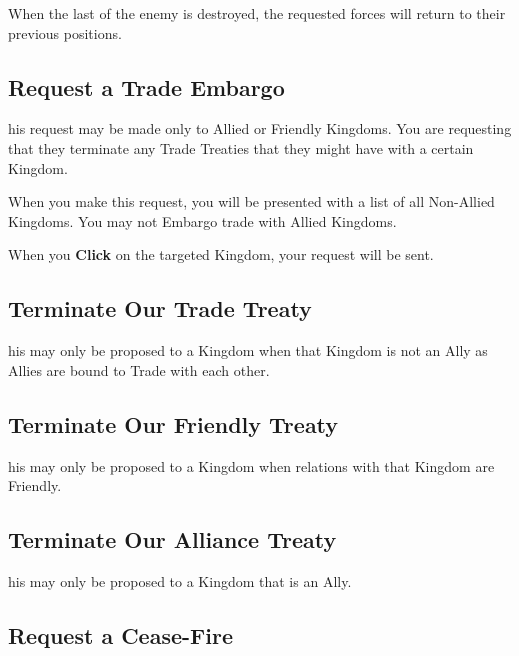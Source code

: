 When the last of the enemy is destroyed, the requested forces will return to their previous positions.

\subsection{\textsf{Request a Trade Embargo}}


his request may be made only to Allied or Friendly Kingdoms. You are requesting that they terminate any Trade Treaties that they might have with a certain Kingdom.

When you make this request, you will be presented with a list of all Non-Allied Kingdoms. You may not Embargo trade with Allied Kingdoms.

When you \textbf{Click} on the targeted Kingdom, your request will be sent.

\subsection{\textsf{Terminate Our Trade Treaty}}


his may only be proposed to a Kingdom when that Kingdom is not an Ally as Allies are bound to Trade with each other.

\subsection{\textsf{Terminate Our Friendly Treaty}}


his may only be proposed to a Kingdom when relations with that Kingdom are Friendly.

\subsection{\textsf{Terminate Our Alliance Treaty}}


his may only be proposed to a Kingdom that is an Ally.

\subsection{\textsf{Request a Cease-Fire}}

